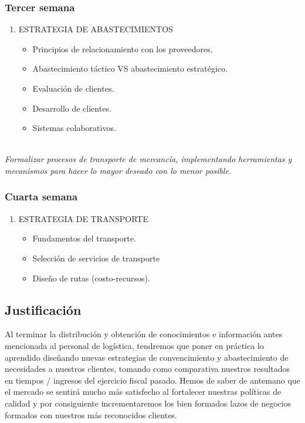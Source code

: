 		\subsubsection{Tercer semana}	
		\begin{enumerate}
				\item ESTRATEGIA DE ABASTECIMIENTOS
				\begin{itemize}
					\item Principios de relacionamiento con los proveedores.
					\item Abastecimiento táctico VS abastecimiento estratégico.
					\item Evaluación de clientes.
					\item Desarrollo de clientes.
					\item Sistemas colaborativos.
				\end{itemize}
			\end{enumerate}
		\textit{\\Formalizar procesos de transporte de mercancía, implementando herramientas y mecanismos para hacer lo mayor deseado con lo menor posible.}
		\subsubsection{Cuarta semana}	
		\begin{enumerate}
				\item ESTRATEGIA DE TRANSPORTE
				\begin{itemize}
					\item Fundamentos del transporte.
					\item Selección de servicios de transporte
					\item Diseño de rutas (costo-recursos).
				\end{itemize}
			\end{enumerate}		
			
	\subsection{ Justificación}
	Al terminar la distribución y obtención de conocimientos e información  antes mencionada al personal de logística, tendremos que poner en práctica lo aprendido diseñando nuevas estrategias de convencimiento y abastecimiento de necesidades a nuestros clientes, tomando como comparativa nuestros resultados en tiempos / ingresos del ejercicio fiscal pasado. Hemos de saber de antemano que el mercado se sentirá mucho más satisfecho al fortalecer nuestras políticas de calidad y por consiguiente incrementaremos los bien formados lazos de negocios formados con nuestros más reconocidos clientes.
